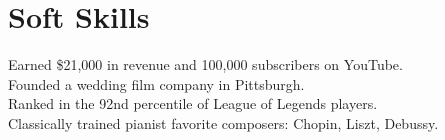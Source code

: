 \section{Soft Skills}

\begin{itemize}[leftmargin=0.15in, label={}]
  \small{
    \item{
      Earned \$21,000 in revenue and 100,000 subscribers on YouTube.\\
      Founded a wedding film company in Pittsburgh. \\
      Ranked in the 92nd percentile of League of Legends players. \\
      Classically trained pianist favorite composers: Chopin, Liszt, Debussy. \\
    }
  }
\end{itemize}